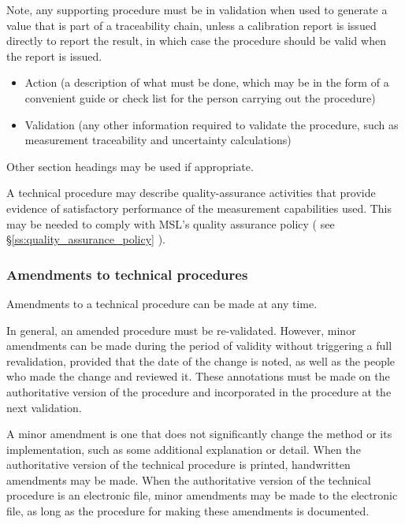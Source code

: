 Note, any supporting procedure must be in validation when used to generate a value that is part of a traceability chain, unless a calibration report is issued directly to report the result, in which case the procedure should be valid when the report is issued. 

\begin{itemize}
\item Action (a description of what must be done, which may be in the form of a convenient guide or check list for the person carrying out the procedure) 
\item Validation (any other information required to validate the procedure, such as measurement traceability and uncertainty calculations)
\end{itemize}

Other section headings may be used if appropriate.

A technical procedure may describe quality-assurance activities that provide evidence of satisfactory performance of the measurement capabilities used.  This may be needed to comply with MSL's quality assurance policy ( see \S\ref{ss:quality_assurance_policy} ).

\subsubsection{Amendments to technical procedures}
Amendments to a technical procedure can be made at any time. 

In general, an amended procedure must be re-validated. However, minor amendments can be made during the period of validity without triggering a full revalidation, provided that the date of the change is noted, as well as the people who made the change and reviewed it. These annotations must be made on the authoritative version of the procedure and incorporated in the procedure at the next validation.

A minor amendment is one that does not significantly change the method or its implementation, such as some additional explanation or detail.  When the authoritative version of the technical procedure is printed, handwritten amendments may be made.  When the authoritative version of the technical procedure is an electronic file, minor amendments may be made to the electronic file, as long as the procedure for making these amendments is documented.

